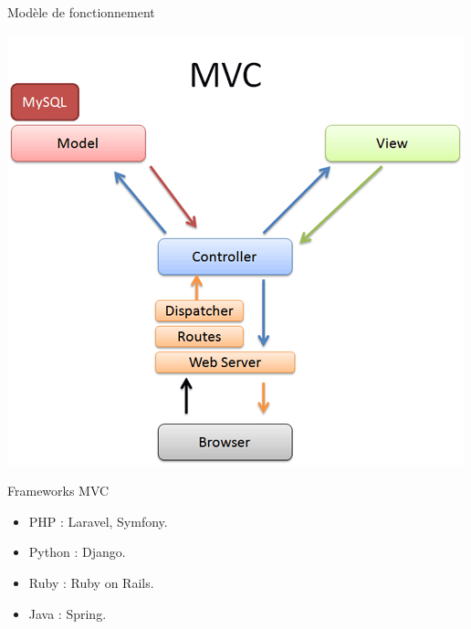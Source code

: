 \documentclass{beamer}
\begin{document}
\begin{frame}{Modèle de fonctionnement}
  \begin{center}
    \includegraphics[scale=0.4]{images/mvc-rails.converted.png}
  \end{center}
\end{frame}

\begin{frame}{Frameworks MVC}
\begin{itemize}
  \item PHP : Laravel, Symfony.
  \item Python : Django.
  \item Ruby : Ruby on Rails.
  \item Java : Spring.
\end{itemize}
\end{frame}
\end{document}

